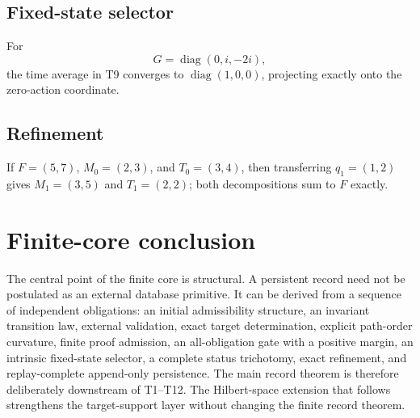 \subsection{Fixed-state selector}
For
\[
G=\operatorname{diag}(0,i,-2i),
\]
the time average in T9 converges to $\operatorname{diag}(1,0,0)$, projecting exactly onto the zero-action coordinate.

\subsection{Refinement}
If $F=(5,7)$, $M_0=(2,3)$, and $T_0=(3,4)$, then transferring $q_1=(1,2)$ gives $M_1=(3,5)$ and $T_1=(2,2)$; both decompositions sum to $F$ exactly.

\section{Finite-core conclusion}

The central point of the finite core is structural. A persistent record need not be postulated as an external database primitive. It can be derived from a sequence of independent obligations: an initial admissibility structure, an invariant transition law, external validation, exact target determination, explicit path-order curvature, finite proof admission, an all-obligation gate with a positive margin, an intrinsic fixed-state selector, a complete status trichotomy, exact refinement, and replay-complete append-only persistence. The main record theorem is therefore deliberately downstream of T1--T12. The Hilbert-space extension that follows strengthens the target-support layer without changing the finite record theorem.
